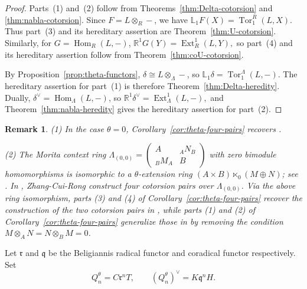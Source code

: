 \documentclass[11pt,reqno]{amsart}
\numberwithin{equation}{section}
\newtheorem{remark}[theorem]{Remark}
\newcommand{\Ext}{\operatorname{Ext}}
\newcommand{\Hom}{\operatorname{Hom}}
\newcommand{\Tor}{\operatorname{Tor}}
\newcommand{\radf}{\mathfrak r}
\newcommand{\coradf}{\mathfrak q}
\begin{document}
\begin{proof}
Parts~(1) and~(2) follow from Theorems~\ref{thm:Delta-cotorsion} and \ref{thm:nabla-cotorsion}. Since $F=L\otimes_R-$, we have
$
\mathbb{L}_1F(X)=\Tor_1^R(L,X).
$
Thus part~(3) and its hereditary assertion are Theorem~\ref{thm:U-cotorsion}. Similarly, for $G=\Hom_R(L,-)$,
$
\mathbb{R}^1G(Y)=\Ext_R^1(L,Y),
$
so part~(4) and its hereditary assertion follow from Theorem~\ref{thm:coU-cotorsion}.

By Proposition~\ref{prop:theta-functors}, $\delta\cong L\otimes_\Lambda-$, so
$
\mathbb{L}_1\delta=\Tor_1^\Lambda(L,-).
$
The hereditary assertion for part~(1) is therefore Theorem~\ref{thm:Delta-heredity}. Dually, $\delta^\vee=\Hom_\Lambda(L,-)$, so
$
\mathbb{R}^1\delta^\vee=\Ext_\Lambda^1(L,-),
$
and Theorem~\ref{thm:nabla-heredity} gives the hereditary assertion for part~(2).
\end{proof}

\begin{remark}
{\rm (1) In the case $\theta=0$, Corollary~\ref{cor:theta-four-pairs} recovers \cite[Theorem~4.2]{MaoTrivial}.

(2) The Morita context ring $\Lambda_{(0,0)}=\begin{pmatrix}
A & {}_AN_B\\
{}_BM_A & B
\end{pmatrix}$ with zero bimodule homomorphisms is isomorphic to a $\theta$-extension ring $(A\times B)\ltimes_0 (M\oplus N)$; see
\cite[Section~7]{MaoTrivial}. In \cite{CuiRongZhang},  Zhang-Cui-Rong construct four cotorsion pairs over $\Lambda_{(0,0)}$. Via the above ring isomorphism, parts (3) and (4) of Corollary~\ref{cor:theta-four-pairs} recover
the construction of the two cotorsion pairs in \cite[Theorem~1.1]{CuiRongZhang}, while parts (1) and (2) of Corollary~\ref{cor:theta-four-pairs} generalize those in \cite[Theorem~1.2]{CuiRongZhang} by removing the condition
$M\otimes_AN=N\otimes_BM=0$.
}
\end{remark}


Let $\radf$ and $\coradf$ be the Beligiannis radical functor and coradical functor respectively. Set
\[
Q_n^\theta=C\radf^nT,
\qquad
(Q_n^\theta)^\vee=K\coradf^nH.
\]
\end{document}
